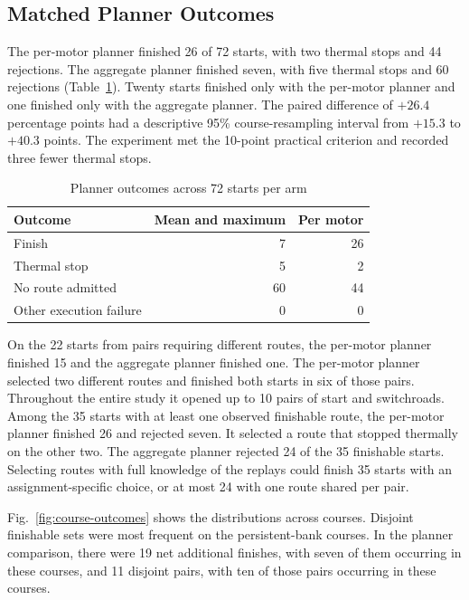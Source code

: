 \documentclass{ieeeaccess}
\begin{document}
\subsection{Matched Planner Outcomes}

The per-motor planner finished 26 of 72 starts, with two thermal stops and 44 rejections. The aggregate planner finished seven, with five thermal stops and 60 rejections (Table~\ref{tab:planner-results}). Twenty starts finished only with the per-motor planner and one finished only with the aggregate planner. The paired difference of $+26.4$ percentage points had a descriptive 95\% course-resampling interval from $+15.3$ to $+40.3$ points. The experiment met the 10-point practical criterion and recorded three fewer thermal stops.

\begin{table}[!t]
\caption{Planner outcomes across 72 starts per arm}
\label{tab:planner-results}
\centering
\footnotesize
\renewcommand{\arraystretch}{1.13}
\begin{tabular}{@{}lrr@{}}
\hline
Outcome & Mean and maximum & Per motor \\
\hline
Finish & 7 & 26 \\
Thermal stop & 5 & 2 \\
No route admitted & 60 & 44 \\
Other execution failure & 0 & 0 \\
\hline
\end{tabular}
\end{table}

On the 22 starts from pairs requiring different routes, the per-motor planner finished 15 and the aggregate planner finished one. The per-motor planner selected two different routes and finished both starts in six of those pairs. Throughout the entire study it opened up to 10 pairs of start and switchroads. Among the 35 starts with at least one observed finishable route, the per-motor planner finished 26 and rejected seven. It selected a route that stopped thermally on the other two. The aggregate planner rejected 24 of the 35 finishable starts. Selecting routes with full knowledge of the replays could finish 35 starts with an assignment-specific choice, or at most 24 with one route shared per pair.

Fig.~\ref{fig:course-outcomes} shows the distributions across courses. Disjoint finishable sets were most frequent on the persistent-bank courses. In the planner comparison, there were 19 net additional finishes, with seven of them occurring in these courses, and 11 disjoint pairs, with ten of those pairs occurring in these courses.
\end{document}

